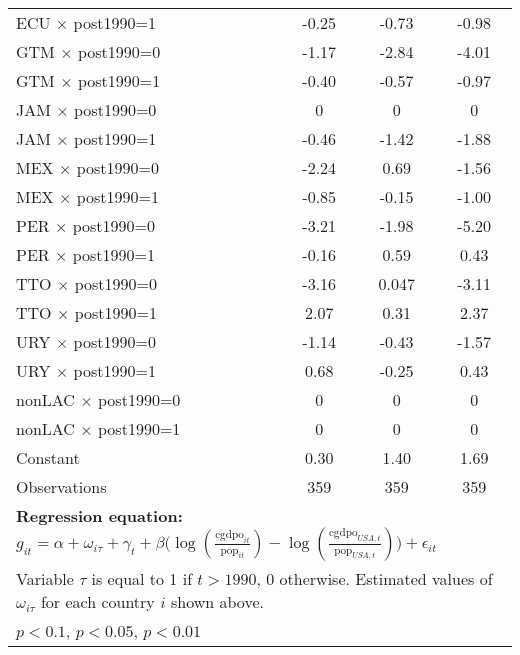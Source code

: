 \begin{table}[htbp]
\begin{tabular}{l*{3}{c}}
ECU $\times$ post1990=1&    -0.25\sym{*}  &    -0.73\sym{***}&    -0.98\sym{***}\\
GTM $\times$ post1990=0&    -1.17\sym{***}&    -2.84\sym{***}&    -4.01\sym{***}\\
GTM $\times$ post1990=1&    -0.40\sym{**} &    -0.57\sym{**} &    -0.97\sym{***}\\
JAM $\times$ post1990=0&        0         &        0         &        0         \\
JAM $\times$ post1990=1&    -0.46\sym{***}&    -1.42\sym{***}&    -1.88\sym{***}\\
MEX $\times$ post1990=0&    -2.24\sym{***}&     0.69\sym{***}&    -1.56\sym{***}\\
MEX $\times$ post1990=1&    -0.85\sym{***}&    -0.15         &    -1.00\sym{***}\\
PER $\times$ post1990=0&    -3.21\sym{***}&    -1.98\sym{***}&    -5.20\sym{***}\\
PER $\times$ post1990=1&    -0.16         &     0.59\sym{**} &     0.43         \\
TTO $\times$ post1990=0&    -3.16\sym{***}&    0.047         &    -3.11\sym{***}\\
TTO $\times$ post1990=1&     2.07\sym{***}&     0.31\sym{*}  &     2.37\sym{***}\\
URY $\times$ post1990=0&    -1.14\sym{***}&    -0.43         &    -1.57\sym{***}\\
URY $\times$ post1990=1&     0.68\sym{***}&    -0.25         &     0.43\sym{**} \\
nonLAC $\times$ post1990=0&        0         &        0         &        0         \\
nonLAC $\times$ post1990=1&        0         &        0         &        0         \\
Constant        &     0.30         &     1.40\sym{***}&     1.69\sym{***}\\
\midrule
Observations    &      359         &      359         &      359         \\
\bottomrule
\multicolumn{4}{l}{\footnotesize \textbf{Regression equation:} \(g_{it} = \alpha + \omega_{i\tau} + \gamma_t + \beta \big(\log (\frac{\textrm{cgdpo}_{it}}{\textrm{pop}_{it}} ) - \log (\frac{\textrm{cgdpo}_{USA,t}}{\textrm{pop}_{USA,t}}  ) \big) + \epsilon_{it}\)}\\
\multicolumn{4}{l}{\footnotesize Variable \(\tau\) is equal to 1 if \(t > 1990\), 0 otherwise. Estimated values of \(\omega_{i\tau}\) for each country \(i\) shown above.}\\
\multicolumn{4}{l}{\footnotesize \sym{*} \(p<0.1\), \sym{**} \(p<0.05\), \sym{***} \(p<0.01\)}\\
\end{tabular}
\end{table}
